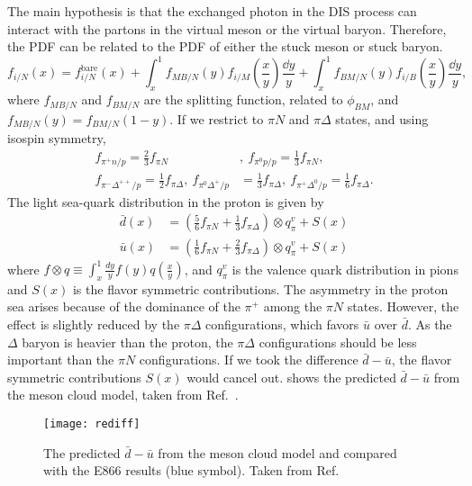 \documentclass[../main.tex]{subfiles}
\begin{document}
The main hypothesis is that the exchanged photon in the DIS process can interact with the partons in the
virtual meson or the virtual
baryon. Therefore, the PDF can be related to the PDF of either the stuck meson or stuck baryon.
\begin{equation}
	f_{i/N}\left(x\right) = f_{i/N}^{\mathrm{bare}}\left(x\right) +  \int^1_x f_{MB/N}\left(y\right) f_{i/M}\left(\frac{x}{y}\right) \frac{\dd{y}}{y} + \int^1_x f_{BM/N}\left(y\right) f_{i/B}\left(\frac{x}{y}\right) \frac{\dd{y}}{y},
\end{equation}
where $f_{MB/N}$ and $f_{BM/N}$ are the splitting function, related to $\phi_{BM}$, and $f_{MB/N}(y)=f_{BM/N}(1-y)$.
If we restrict to $\pi N$ and $\pi\Delta$ states, and using isospin symmetry,
\begin{align}
	f_{\pi^+n/p}=\frac{2}{3} f_{\pi N}                                       & , ~f_{\pi^0 p/p}=\frac{1}{3} f_{\pi N},                                         \\
	f_{\pi^-\Delta^{++}/p}=\frac{1}{2} f_{\pi \Delta}, ~f_{\pi^0 \Delta^+/p} & =\frac{1}{3} f_{\pi \Delta},  ~f_{\pi^+ \Delta^0/p}=\frac{1}{6} f_{\pi \Delta}.
\end{align}
The light sea-quark distribution in the proton is given by
\begin{align}
	\bar{d}(x) & = \left(\frac{5}{6}f_{\pi N} + \frac{1}{3}f_{\pi \Delta}\right)\otimes q^v_\pi + S(x) \\
	\bar{u}(x) & = \left(\frac{1}{6}f_{\pi N} + \frac{2}{3}f_{\pi \Delta}\right)\otimes q^v_\pi + S(x)
	\label{eq:pion_dbub}
\end{align}
where $f\otimes q\equiv \int^1_x \frac{dy}{y}f(y)q\left(\frac{x}{y}\right)$, and $q^v_\pi$ is the valence
quark distribution in pions and $S(x)$ is the flavor symmetric contributions.
The asymmetry in the proton sea arises because of the dominance of the $\pi^+$ among the $\pi N$ states.
However, the effect is slightly reduced by the $\pi\Delta$ configurations, which favors $\bar{u}$ over $\bar{d}$.
As the $\Delta$ baryon is heavier than the proton, the $\pi\Delta$ configurations should be less important than
the $\pi N$ configurations.
If we took the difference $\bar{d}-\bar{u}$, the flavor symmetric contributions $S(x)$ would cancel out.
shows the predicted $\bar{d}-\bar{u}$ from the meson cloud model, taken from Ref.~\cite{alberg2022}.
\begin{figure}
	\centering
	\texttt{[image: rediff]}
	\caption{The predicted $\bar{d}-\bar{u}$ from the meson cloud model and compared with the E866 results (blue symbol). Taken from Ref.~\cite{alberg2022}}
	\label{fig:pion_cloud}
\end{figure}
\end{document}
